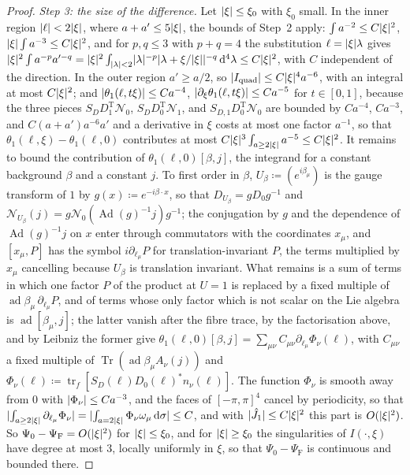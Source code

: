 \documentclass[11pt]{preprint}
\newcommand{\dd}{\mathrm{d}}
\DeclarePairedDelimiter{\abs}{\lvert}{\rvert}
\numberwithin{equation}{section}
\theoremstyle{definition}
\theoremstyle{remark}
\theoremstyle{plain}
\begin{document}
\begin{proof}
\emph{Step 3: the size of the difference.} Let $\abs{\xi} \leq \xi_0$ with $\xi_0$ small. In the inner region $\abs{\ell} < 2\abs{\xi}$, where $a + a' \leq 5\abs{\xi}$, the bounds of Step~2 apply: $\int a^{-2} \leq C\abs{\xi}^2$, $\abs{\xi}\int a^{-3} \leq C\abs{\xi}^2$, and for $p, q \leq 3$ with $p + q = 4$ the substitution $\ell = \abs{\xi}\lambda$ gives $\abs{\xi}^2\int a^{-p}a'^{-q} = \abs{\xi}^2\int_{\abs{\lambda}<2}\abs{\lambda}^{-p}\abs{\lambda + \xi/\abs{\xi}}^{-q}\,\dd^4\lambda \leq C\abs{\xi}^2$, with $C$ independent of the direction. In the outer region $a' \geq a/2$, so $\abs{I_{\mathrm{quad}}} \leq C\abs{\xi}^4a^{-6}$, with an integral at most $C\abs{\xi}^2$; and $\abs{\theta_1(\ell, t\xi)} \leq Ca^{-4}$, $\abs{\partial_\xi\theta_1(\ell, t\xi)} \leq Ca^{-5}$ for $t \in [0, 1]$, because the three pieces $S_DD_1^{\mathrm T}\mathcal N_0$, $S_DD_0^{\mathrm T}\mathcal N_1$, and $S_{D,1}D_0^{\mathrm T}\mathcal N_0$ are bounded by $Ca^{-4}$, $Ca^{-3}$, and $C(a + a')a^{-6}a'$ and a derivative in $\xi$ costs at most one factor $a^{-1}$, so that $\theta_1(\ell, \xi) - \theta_1(\ell, 0)$ contributes at most $C\abs{\xi}^3\int_{a\geq2\abs{\xi}}a^{-5} \leq C\abs{\xi}^2$. It remains to bound the contribution of $\theta_1(\ell, 0)[\beta, j]$, the integrand for a constant background $\beta$ and a constant $j$. To first order in $\beta$, $U_\beta \coloneqq (e^{i\beta_\mu})$ is the gauge transform of $1$ by $g(x) \coloneqq e^{-i\beta\cdot x}$, so that $D_{U_\beta} = gD_0g^{-1}$ and $\mathcal N_{U_\beta}(j) = g\mathcal N_0(\operatorname{Ad}(g)^{-1}j)g^{-1}$; the conjugation by $g$ and the dependence of $\operatorname{Ad}(g)^{-1}j$ on $x$ enter through commutators with the coordinates $x_\mu$, and $[x_\mu, P]$ has the symbol $i\partial_{\ell_\mu}P$ for translation-invariant $P$, the terms multiplied by $x_\mu$ cancelling because $U_\beta$ is translation invariant. What remains is a sum of terms in which one factor $P$ of the product at $U = 1$ is replaced by a fixed multiple of $\operatorname{ad}\beta_\mu\,\partial_{\ell_\mu}P$, and of terms whose only factor which is not scalar on the Lie algebra is $\operatorname{ad}[\beta_\mu, j]$; the latter vanish after the fibre trace, by the factorisation above, and by Leibniz the former give $\theta_1(\ell, 0)[\beta, j] = \sum_{\mu\nu}C_{\mu\nu}\partial_{\ell_\mu}\Phi_\nu(\ell)$, with $C_{\mu\nu}$ a fixed multiple of $\operatorname{Tr}(\operatorname{ad}\beta_\mu A_\nu(j))$ and $\Phi_\nu(\ell) \coloneqq \operatorname{tr}_f[S_D(\ell)D_0(\ell)^*n_\nu(\ell)]$. The function $\Phi_\nu$ is smooth away from $0$ with $\abs{\Phi_\nu} \leq Ca^{-3}$, and the faces of $[-\pi, \pi]^4$ cancel by periodicity, so that $\abs{\int_{a\geq2\abs{\xi}}\partial_{\ell_\mu}\Phi_\nu} = \abs{\int_{a=2\abs{\xi}}\Phi_\nu\omega_\mu\,\dd\sigma} \leq C$, and with $\abs{\hat J_1} \leq C\abs{\xi}^2$ this part is $O(\abs{\xi}^2)$. So $\Psi_0 - \Psi_{\mathrm F} = O(\abs{\xi}^2)$ for $\abs{\xi} \leq \xi_0$, and for $\abs{\xi} \geq \xi_0$ the singularities of $I(\cdot, \xi)$ have degree at most $3$, locally uniformly in $\xi$, so that $\Psi_0 - \Psi_{\mathrm F}$ is continuous and bounded there.


\end{proof}
\end{document}
